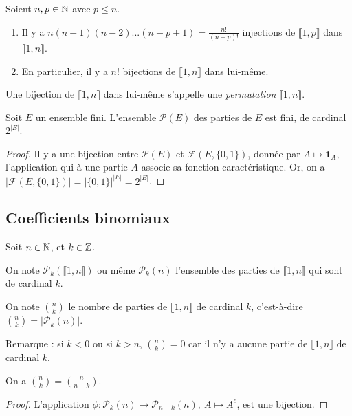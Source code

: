 \begin{proposition}Soient $n, p\in \mathbb{N}$ avec $p\leq n$.
\begin{enumerate}
\item Il y a $n(n-1)(n-2)...(n-p+1)=\frac{n!}{(n-p)!}$ injections de $\llbracket 1,p\rrbracket$ dans $\llbracket 1,n\rrbracket$.
\item En particulier, il y a $n!$ bijections de $\llbracket 1,n\rrbracket$ dans lui-même.
\end{enumerate}
\end{proposition}

Une bijection de $\llbracket 1,n\rrbracket$ dans lui-même s'appelle une \emph{permutation} $\llbracket 1,n\rrbracket$.

\begin{proposition}Soit $E$ un ensemble fini. L'ensemble $\mathcal P(E)$ des parties de $E$ est fini, de cardinal $2^{|E|}$.
\end{proposition}
\begin{proof}
Il y a une bijection entre $\mathcal P(E)$ et $\mathcal F(E,\{0,1\})$, donnée par $A\mapsto \mathbf{1}_A$, l'application qui à une partie $A$ associe sa fonction caractéristique. Or, on a $|\mathcal F(E,\{0,1\})| = |\{0,1\}|^{|E|} =2^{|E|} $.
\end{proof}

\subsection{Coefficients binomiaux}

\begin{definition}
Soit $n\in\mathbb{N}$, et $k\in \mathbb{Z}$. 

On note $\mathcal P_k(\llbracket 1,n\rrbracket)$ ou même $\mathcal P_k(n)$ l'ensemble des parties de $\llbracket 1,n\rrbracket$ qui sont de cardinal $k$.

On note $\binom{n}{k}$ le nombre de parties de $\llbracket 1,n\rrbracket$ de cardinal $k$, c'est-à-dire $\binom{n}{k}=|\mathcal P_k(n)|$.
\end{definition}

Remarque : si $k<0$ ou si $k>n$, $\binom{n}{k}=0$ car il n'y a aucune partie de $\llbracket 1,n\rrbracket$ de cardinal $k$.

\begin{proposition}
On a $\binom{n}{k} = \binom{n}{n-k}$.
\end{proposition}
\begin{proof}
L'application $\phi : \mathcal P_k(n) \to \mathcal P_{n-k}(n), \: A\mapsto  A^c$, est une bijection.
\end{proof}

